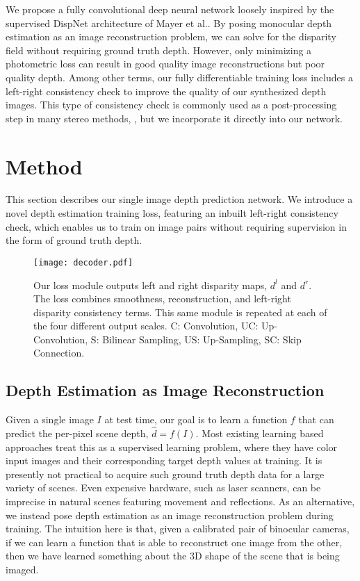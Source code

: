 \documentclass[10pt,twocolumn,letterpaper]{article}
\makeatletter
\newcommand*{\ea}{et al.\@\xspace}
\makeatother
\begin{document}
We propose a fully convolutional deep neural network loosely inspired by the supervised DispNet architecture of Mayer \ea\cite{mayer2015large}. 
By posing monocular depth estimation as an image reconstruction problem, we can solve for the disparity field without requiring ground truth depth. 
However, only minimizing a photometric loss can result in good quality image reconstructions but poor quality depth.
Among other terms, our fully differentiable training loss includes a left-right consistency check to improve the quality of our synthesized depth images. 
This type of consistency check is commonly used as a post-processing step in many stereo methods, \eg \cite{vzbontar2016stereo}, but we incorporate it directly into our network. 


\section{Method}
This section describes our single image depth prediction network.
We introduce a novel depth estimation training loss, featuring an inbuilt left-right consistency check, which enables us to train on image pairs without requiring supervision in the form of ground truth depth. 

\begin{figure}
  \centering
  \texttt{[image: decoder.pdf]}
  \caption{Our loss module outputs left and right disparity maps, $d^l$ and $d^r$. The loss combines smoothness, reconstruction, and left-right disparity consistency terms. This same module is repeated at each of the four different output scales. C: Convolution, UC: Up-Convolution, S: Bilinear Sampling, US: Up-Sampling, SC: Skip Connection. \vspace{-5pt}}
  \label{fig:pipeline}
\end{figure}



\subsection{Depth Estimation as Image Reconstruction}
Given a single image $I$ at test time, our goal is to learn a function $f$ that can predict the per-pixel scene depth, $\hat{d} = f(I)$. 
Most existing learning based approaches treat this as a supervised learning problem, where they have color input images and their corresponding target depth values at training.
It is presently not practical to acquire such ground truth depth data for a large variety of scenes. Even expensive hardware, such as laser scanners, can be imprecise in natural scenes featuring movement and reflections.
As an alternative, we instead pose depth estimation as an image reconstruction problem during training.
The intuition here is that, given a calibrated pair of binocular cameras, if we can learn a function that is able to reconstruct one image from the other, then we have learned something about the $3$D shape of the scene that is being imaged.
\end{document}
